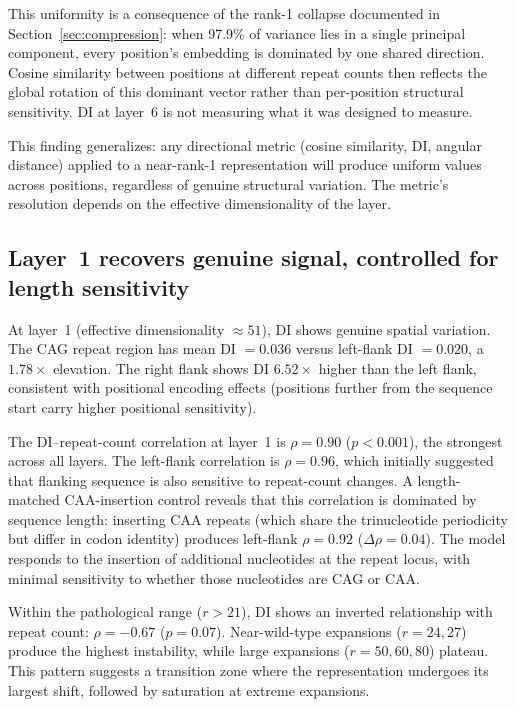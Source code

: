 \documentclass[11pt]{article}
\begin{document}
This uniformity is a consequence of the rank-1 collapse documented in
Section~\ref{sec:compression}: when 97.9\% of variance lies in a single
principal component, every position's embedding is dominated by one
shared direction. Cosine similarity between positions at different
repeat counts then reflects the global rotation of this dominant vector
rather than per-position structural sensitivity. DI at layer~6 is not
measuring what it was designed to measure.

This finding generalizes: any directional metric (cosine similarity, DI,
angular distance) applied to a near-rank-1 representation will produce
uniform values across positions, regardless of genuine structural
variation. The metric's resolution depends on the effective
dimensionality of the layer.

\subsection{Layer~1 recovers genuine signal, controlled for length sensitivity}

At layer~1 (effective dimensionality $\approx 51$), DI shows genuine
spatial variation. The CAG repeat region has mean DI $= 0.036$ versus
left-flank DI $= 0.020$, a $1.78\times$ elevation. The right flank
shows DI $6.52\times$ higher than the left flank, consistent with
positional encoding effects (positions further from the sequence start
carry higher positional sensitivity).

The DI--repeat-count correlation at layer~1 is $\rho = 0.90$
($p < 0.001$), the strongest across all layers. The left-flank
correlation is $\rho = 0.96$, which initially suggested that
flanking sequence is also sensitive to repeat-count changes.
A length-matched CAA-insertion control reveals that this correlation
is dominated by sequence length: inserting CAA repeats (which share
the trinucleotide periodicity but differ in codon identity) produces
left-flank $\rho = 0.92$ ($\Delta\rho = 0.04$). The model responds to
the insertion of additional nucleotides at the repeat locus, with
minimal sensitivity to whether those nucleotides are CAG or CAA.

Within the pathological range ($r > 21$), DI shows an inverted
relationship with repeat count: $\rho = -0.67$ ($p = 0.07$).
Near-wild-type expansions ($r = 24, 27$) produce the highest
instability, while large expansions ($r = 50, 60, 80$) plateau.
This pattern suggests a transition zone where the representation
undergoes its largest shift, followed by saturation at extreme
expansions.
\end{document}

